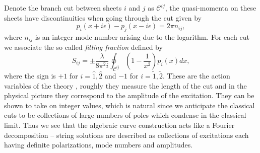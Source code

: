 Denote the branch cut between sheets $i$ and $j$ as $\mathcal{C}^{ij}$, the quasi-momenta on these sheets have discontinuities when going through the cut given by
\begin{equation}
	p_i(x + i\epsilon) - p_j(x - i\epsilon) = 2 \pi n_{ij},
	\label{eq:cut_condition}
\end{equation}  
where $n_{ij}$ is an integer mode number arising due to the logarithm.
For each cut we associate the so called \emph{filling fraction} defined by
\begin{equation}
	\label{eq:filling}
	S_{ij} = \pm \frac{\lambda}{8 \pi^2 i} \oint_{\mathcal{C}^{ij}} \left( 1 - \frac{1}{x^2} \right) p_i(x) dx,
\end{equation}
where the sign is $+1$ for $i=\hat{1},\hat{2}$ and $-1$ for $i=\tilde{1},\tilde{2}$. These are the action variables of the theory \cite{Dorey:2006zj}, roughly they measure the length of the cut and in the physical picture they correspond to the amplitude of the excitation. 
They can be shown to take on integer values, which is natural since we anticipate the classical cuts to be collections of large numbers of poles which condense in the classical limit.
Thus we see that the algebraic curve construction acts like a Fourier decomposition -- string solutions are described as collections of excitations each having definite polarizations, mode numbers and amplitudes.

